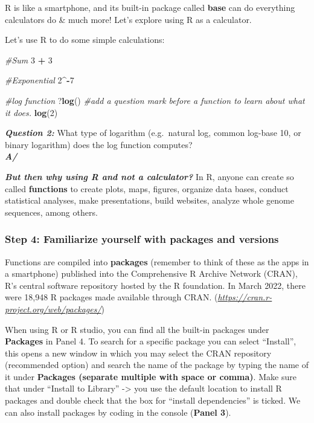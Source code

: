 \documentclass[]{article}
\newenvironment{Shaded}{\begin{snugshade}}{\end{snugshade}}
\newcommand{\CommentTok}[1]{\textcolor[rgb]{0.56,0.35,0.01}{\textit{#1}}}
\newcommand{\DecValTok}[1]{\textcolor[rgb]{0.00,0.00,0.81}{#1}}
\newcommand{\KeywordTok}[1]{\textcolor[rgb]{0.13,0.29,0.53}{\textbf{#1}}}
\newcommand{\NormalTok}[1]{#1}
\newcommand{\OperatorTok}[1]{\textcolor[rgb]{0.81,0.36,0.00}{\textbf{#1}}}
\newcommand{\StringTok}[1]{\textcolor[rgb]{0.31,0.60,0.02}{#1}}
\begin{document}
R is like a smartphone, and its built-in package called \textbf{base}
can do everything calculators do \& much more! Let's explore using R as
a calculator.

Let's use R to do some simple calculations:

\begin{Shaded}
\begin{Highlighting}[]
\CommentTok{#Sum}
\DecValTok{3} \OperatorTok{+}\StringTok{ }\DecValTok{3}

\CommentTok{#Exponential}
\DecValTok{2}\OperatorTok{^-}\DecValTok{7}

\CommentTok{#log function}
\NormalTok{?}\KeywordTok{log}\NormalTok{() }\CommentTok{#add a question mark before a function to learn about what it does.}
\KeywordTok{log}\NormalTok{(}\DecValTok{2}\NormalTok{)}
\end{Highlighting}
\end{Shaded}

\textbf{\emph{Question 2:}} What type of logarithm (e.g.~natural log,
common log-base 10, or binary logarithm) does the log function
computes?\\
\textbf{\emph{A/}}

\textbf{\emph{But then why using R and not a calculator?}} In R, anyone
can create so called \textbf{functions} to create plots, maps, figures,
organize data bases, conduct statistical analyses, make presentations,
build websites, analyze whole genome sequences, among others.

\hypertarget{step-4-familiarize-yourself-with-packages-and-versions}{%
\subsubsection{Step 4: Familiarize yourself with packages and
versions}\label{step-4-familiarize-yourself-with-packages-and-versions}}

Functions are compiled into \textbf{packages} (remember to think of
these as the apps in a smartphone) published into the Comprehensive R
Archive Network (CRAN), R's central software repository hosted by the R
foundation. In March 2022, there were 18,948 R packages made available
through CRAN. (\emph{\url{https://cran.r-project.org/web/packages/}})

When using R or R studio, you can find all the built-in packages under
\textbf{Packages} in Panel 4. To search for a specific package you can
select ``Install'', this opens a new window in which you may select the
CRAN repository (recommended option) and search the name of the package
by typing the name of it under \textbf{Packages (separate multiple with
space or comma)}. Make sure that under ``Install to Library''
-\textgreater{} you use the default location to install R packages and
double check that the box for ``install dependencies'' is ticked. We can
also install packages by coding in the console (\textbf{Panel 3}).
\end{document}
